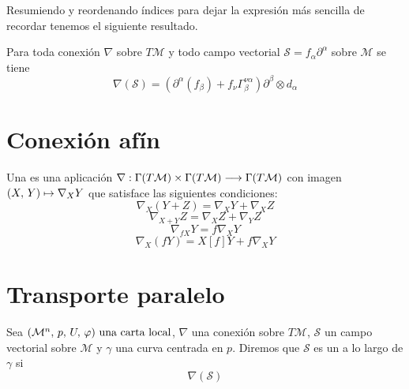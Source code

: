 Resumiendo y reordenando índices para dejar la expresión más sencilla de recordar tenemos el siguiente resultado.
\begin{result}
  Para toda conexión $\nabla$ sobre $T\mathcal{M}$ y todo campo vectorial $\mathcal{S}=f_\alpha\partial^\alpha$
  sobre $\mathcal{\mathcal{M}}$ se tiene
  \begin{equation}
    \label{eq:conexion-coordenadas}
    \nabla(\mathcal{S}) = (\partial^\alpha(f_\beta)+f_\nu\Gamma_\beta^{\nu\alpha})\partial^\beta\otimes d_\alpha
  \end{equation}
\end{result}

\section{Conexión afín}\label{sec:conexion-affin}
\begin{definition}
  Una  es una aplicación $\nabla:\Gamma(T\mathcal{M})\times\Gamma(T\mathcal{M})\longrightarrow \Gamma(T\mathcal{M})$
  con imagen $(X,\thinspace Y)\mapsto\nabla_X Y$ que satisface las siguientes condiciones:
  \begin{equation}\label{eq:conexion-afin-condicion-1}
    \nabla_X (Y+Z) = \nabla_X Y + \nabla_X Z
  \end{equation}
  \begin{equation}\label{eq:conexion-afin-condicion-2}
    \nabla_{X+Y} Z = \nabla_X Z + \nabla_Y Z
  \end{equation}
  \begin{equation}\label{eq:conexion-afin-condicion-3}
    \nabla_{fX} Y = f\nabla_X Y
  \end{equation}
  \begin{equation}\label{eq:conexion-afin-condicion-4}
    \nabla_X (fY) = X[f] Y + f\nabla_X Y
  \end{equation}
\end{definition}


\section{Transporte paralelo}\label{sec:transporte-paralelo}
\begin{definition}
  Sea $(\mathcal{M}^n,\thinspace p,\thinspace U,\thinspace \varphi)\textmd{ una carta local}$, $\nabla$ una conexión sobre $T\mathcal{M}$, $\mathcal{S}$ un campo vectorial sobre
  $\mathcal{\mathcal{M}}$ y $\gamma$ una curva centrada en $p$. Diremos que $\mathcal{S}$ es un  a lo
  largo de $\gamma$ si
  \begin{equation}
    \nabla(\mathcal{S})
  \end{equation}
\end{definition}